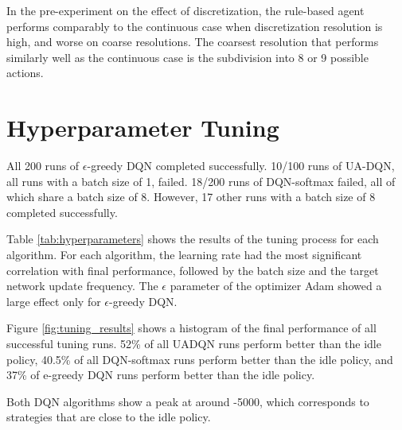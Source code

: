In the pre-experiment on the effect of discretization, the rule-based agent performs comparably to the continuous case when discretization resolution is high, and worse on coarse resolutions. The coarsest resolution that performs similarly well as the continuous case is the subdivision into 8 or 9 possible actions.




\section{Hyperparameter Tuning}
All 200 runs of $\epsilon$-greedy DQN completed successfully.
10/100 runs of UA-DQN, all runs with a batch size of 1, failed.
18/200 runs of DQN-softmax failed, all of which share a batch size of 8.
However, 17 other runs with a batch size of 8 completed successfully.

Table \ref{tab:hyperparameters} shows the results of the tuning process for each algorithm.
For each algorithm, the learning rate had the most significant correlation with final performance, followed by the batch size and the target network update frequency.
The $\epsilon$ parameter of the optimizer Adam showed a large effect only for $\epsilon$-greedy DQN.

Figure \ref{fig:tuning_results} shows a histogram of the final performance of all successful tuning runs.
52\% of all UADQN runs perform better than the idle policy, 40.5\% of all DQN-softmax  runs perform better than the idle policy, and 37\% of e-greedy DQN runs perform better than the idle policy.

Both DQN algorithms show a peak at around -5000, which corresponds to strategies that are close to the idle policy.


